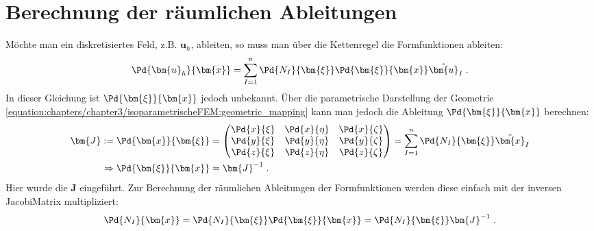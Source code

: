 \documentclass[letterpaper,10pt,german]{jupyterBook}
\begin{document}
\section{Berechnung der räumlichen Ableitungen}
\label{\detokenize{chapters/chapter3/isoparametrischeFEM:berechnung-der-raumlichen-ableitungen}}
\sphinxAtStartPar
Möchte man ein diskretisiertes Feld, z.B. \(\bm{u}_h\), ableiten, so muss man über die Kettenregel die Formfunktionen ableiten:
\begin{equation}\label{equation:chapters/chapter3/isoparametrischeFEM:ableitungFormfunktion}
\begin{split}\begin{align}
\Pd{\bm{u}_h}{\bm{x}} = \sum_{I=1}^{n} \Pd{N_I}{\bm{\xi}} \Pd{\bm{\xi}}{\bm{x}}  \hat{\bm{u}}_I \;.
\end{align}\end{split}
\end{equation}
\sphinxAtStartPar
In dieser Gleichung ist \(\Pd{\bm{\xi}}{\bm{x}}\) jedoch unbekannt. Über die parametrische Darstellung der Geometrie \eqref{equation:chapters/chapter3/isoparametrischeFEM:geometric_mapping} kann man jedoch die Ableitung \(\Pd{\bm{\xi}}{\bm{x}}\) berechnen:
\begin{equation}\label{equation:chapters/chapter3/isoparametrischeFEM:ableitungFormfunktion_02}
\begin{split}\begin{align}
\bm{J} := \Pd{\bm{x}}{\bm{\xi}} & = \begin{pmatrix}
\Pd{x}{\xi} & \Pd{x}{\eta} & \Pd{x}{\zeta} \\
\Pd{y}{\xi} & \Pd{y}{\eta} & \Pd{y}{\zeta} \\
\Pd{z}{\xi} & \Pd{z}{\eta} & \Pd{z}{\zeta} 
\end{pmatrix}
=  \sum_{I=1}^{n} \Pd{N_I}{\bm{\xi}} \hat{\bm{x}}_I \\
\Rightarrow \Pd{\bm{\xi}}{\bm{x}} & = \bm{J}^{-1} \; .
\end{align}\end{split}
\end{equation}
\sphinxAtStartPar
Hier wurde die  \(\bm{J}\) eingeführt. Zur Berechnung der räumlichen Ableitungen der Formfunktionen werden diese einfach mit der inversen Jacobi\sphinxhyphen{}Matrix multipliziert:
\begin{equation}\label{equation:chapters/chapter3/isoparametrischeFEM:ableitungFormfunktion_03}
\begin{split}\Pd{N_I}{\bm{x}} = \Pd{N_I}{\bm{\xi}} \Pd{\bm{\xi}}{\bm{x}} = \Pd{N_I}{\bm{\xi}} \bm{J}^{-1} \; .\end{split}
\end{equation}
\end{document}
